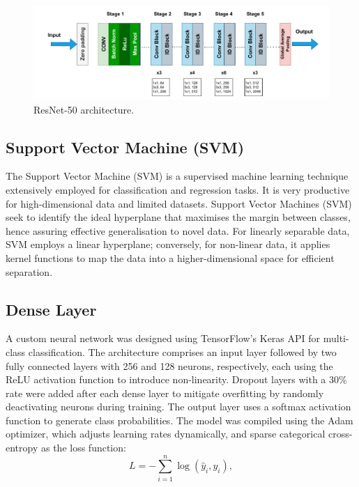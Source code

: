 \begin{figure}[H]
\begin{center}
 \includegraphics[width=15cm]{./fig/ResNet50.pdf}
\caption{ResNet-50 architecture.}
\label{tab:ResNet-50}
\end{center}
\end{figure}

\subsection{Support Vector Machine (SVM)}
\label{sec:sec3_3_2}
The Support Vector Machine (SVM) is a supervised machine learning technique extensively employed for classification and regression tasks. It is very productive for high-dimensional data and limited datasets. Support Vector Machines (SVM) seek to identify the ideal hyperplane that maximises the margin between classes, hence assuring effective generalisation to novel data. For linearly separable data, SVM employs a linear hyperplane; conversely, for non-linear data, it applies kernel functions to map the data into a higher-dimensional space for efficient separation.

\subsection{Dense Layer}
\label{sec:sec3_3_3}
A custom neural network was designed using TensorFlow's Keras API for multi-class classification. The architecture comprises an input layer followed by two fully connected layers with 256 and 128 neurons, respectively, each using the ReLU activation function to introduce non-linearity. Dropout layers with a 30\% rate were added after each dense layer to mitigate overfitting by randomly deactivating neurons during training. The output layer uses a softmax activation function to generate class probabilities. The model was compiled using the Adam optimizer, which adjusts learning rates dynamically, and sparse categorical cross-entropy as the loss function:
\[
L = -\sum_{i=1}^{n} \log(\hat{y}_i, y_i),
\]

